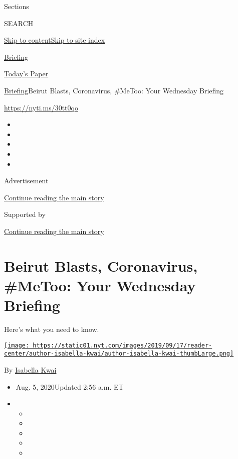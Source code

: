 Sections

SEARCH

\protect\hyperlink{site-content}{Skip to
content}\protect\hyperlink{site-index}{Skip to site index}

\href{https://www.nytimes.com/interactive/2018/briefing/global-morning-briefing-newsletter-signup.html}{Briefing}

\href{https://myaccount.nytimes.com/auth/login?response_type=cookie\&client_id=vi}{}

\href{https://www.nytimes.com/section/todayspaper}{Today's Paper}

\href{/interactive/2018/briefing/global-morning-briefing-newsletter-signup.html}{Briefing}\textbar{}Beirut
Blasts, Coronavirus, \#MeToo: Your Wednesday Briefing

\url{https://nyti.ms/30tt0qo}

\begin{itemize}
\item
\item
\item
\item
\item
\end{itemize}

Advertisement

\protect\hyperlink{after-top}{Continue reading the main story}

Supported by

\protect\hyperlink{after-sponsor}{Continue reading the main story}

\hypertarget{beirut-blasts-coronavirus-metoo-your-wednesday-briefing}{%
\section{Beirut Blasts, Coronavirus, \#MeToo: Your Wednesday
Briefing}\label{beirut-blasts-coronavirus-metoo-your-wednesday-briefing}}

Here's what you need to know.

\href{https://www.nytimes.com/by/isabella-kwai}{\texttt{[image: https://static01.nyt.com/images/2019/09/17/reader-center/author-isabella-kwai/author-isabella-kwai-thumbLarge.png]}}

By \href{https://www.nytimes.com/by/isabella-kwai}{Isabella Kwai}

\begin{itemize}
\item
  Aug. 5, 2020Updated 2:56 a.m. ET
\item
  \begin{itemize}
  \item
  \item
  \item
  \item
  \item
  \end{itemize}
\end{itemize}

